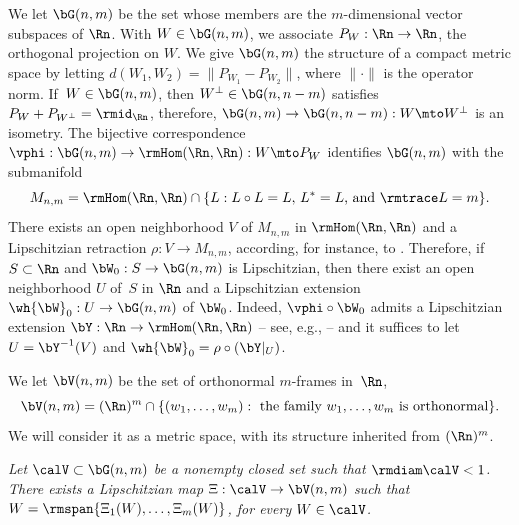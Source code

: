 \begin{Empty}[Grassmannian]
\label{grassmann}
We let $\bG(n,m)$ be the set whose members are the $m$-dimensional vector subspaces of $\Rn$.
With $W \in \bG(n,m)$, we associate $P_W: \Rn \to \Rn$, the orthogonal projection on $W$.
We give $\bG(n,m)$ the structure of a compact metric space by letting $d(W_1,W_2) = \|P_{W_1}-P_{W_2}\|$, where $\|\cdot\|$ is the operator norm.
If~$W \in \bG(n,m)$, then $W^\perp \in \bG(n,n-m)$ satisfies $P_W + P_{W^\perp}=\rmid_{\Rn}$, therefore, $\bG(n,m) \to \bG(n,n-m): W \mto W^\perp$ is an isometry.
The bijective correspondence $\vphi:\bG(n,m) \to \rmHom(\Rn,\Rn): W \mto P_W$ identifies $\bG(n,m)$ with the submanifold
\[
M_{n,m} = \rmHom(\Rn,\Rn) \cap \{ L: L \circ L = L,\, L^*=L \text{, and } \rmtrace L = m \}.
\]
There exists an open neighborhood $V$ of $M_{n,m}$ in $\rmHom(\Rn,\Rn)$ and a Lipschitzian retraction $\rho: V \to M_{n,m}$, according, for instance, to \cite[3.1.20]{GMT}.
Therefore, if $S \subset \Rn$ and $\bW_0: S \to \bG(n,m)$ is Lipschitzian, then there exist an open neighborhood $U$ of~$S$ in $\Rn$ and a Lipschitzian extension $\wh{\bW}_0: U \to \bG(n,m)$ of $\bW_0$.
Indeed, $\vphi \circ \bW_0$ admits a Lipschitzian extension $\bY: \Rn \to \rmHom(\Rn,\Rn)$ -- see, e.g., \cite[2.10.43]{GMT} -- and it suffices to let $U = \bY^{-1}(V)$ and $\wh{\bW}_0 = \rho \circ \left(\bY |_U \right)$.
\end{Empty}

\begin{Empty}
\label{stiefel}
We let $\bV(n,m)$ be the set of orthonormal $m$-frames in~$\Rn$, \ie
\[
\bV(n,m) = (\Rn)^{m} \cap\{ (w_1,\ldots,w_{m}): \text{ the family } w_1,\ldots,w_{m} \text{ is orthonormal}\}.
\]
We will consider it as a metric space, with its structure inherited from $(\Rn)^{m}$.
\end{Empty}

\begin{Empty}[]
\label{grass.param.stief}
{\it
Let $\calV \subset \bG(n,m)$ be a nonempty closed set such that $\rmdiam \calV < 1$. There exists a Lipschitzian map $\Xi: \calV \to \bV(n,m)$ such that $W = \rmspan \{ \Xi_1(W),\ldots,\Xi_m(W)\}$, for every $W \in \calV$.
}
\end{Empty}

